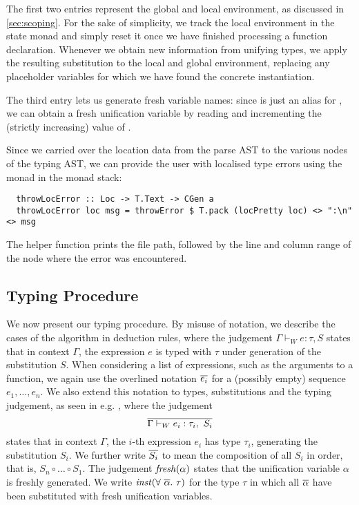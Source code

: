 The first two entries represent the global and local environment, as discussed
in \cref{sec:scoping}. For the sake of simplicity, we track the local
environment in the state monad and simply reset it once we have finished
processing a function declaration.
Whenever we obtain new information from unifying types, we apply the resulting
substitution to the local and global environment, replacing any placeholder
variables for which we have found the concrete instantiation.

The third entry lets us generate fresh variable names: since  is
just an alias for , we can obtain a fresh unification variable by
reading and incrementing the (strictly increasing) value of .

Since we carried over the location data from the parse AST to the various nodes
of the typing AST, we can provide the user with localised type errors using the
 monad in the  monad stack:
\begin{verbatim}
  throwLocError :: Loc -> T.Text -> CGen a
  throwLocError loc msg = throwError $ T.pack (locPretty loc) <> ":\n" <> msg
\end{verbatim}
%
The helper function  prints the file path, followed by the line
and column range of the node where the error was encountered.


\subsection{Typing Procedure} \label{sec:typing-procedure}

We now present our typing procedure. By misuse of notation, we describe
the cases of the algorithm in deduction rules, where the judgement
$\Gamma \vdash_W e : \tau, S$ states that in context $\Gamma$, the expression $e$
is typed with $\tau$ under generation of the substitution $S$.
When considering a list of expressions, such as the arguments to a function, we
again use the overlined notation $\overline{e_i}$ for a (possibly empty) sequence
$e_1,\dots,e_n$. We also extend this notation to types, substitutions and the
typing judgement, as seen in e.g. , where the judgement
\[ \overline{ \Gamma \vdash_W e_i : \tau_i,\ S_i } \]
states that in context $\Gamma$, the $i$-th expression $e_i$ has type $\tau_i$,
generating the substitution $S_i$.
We further write $\overline{S_i}$ to mean the composition of all $S_i$ in order, that
is, $S_n \circ \dots \circ S_1$.
%
The judgement $\mathit{fresh}(\alpha)$ states that the unification variable $\alpha$ is
freshly generated.
We write $\inst(\forall\ \set{\alpha}.\ \tau)$ for the type $\tau$ in which
all $\overline{\alpha}$ have been substituted with fresh unification variables.

